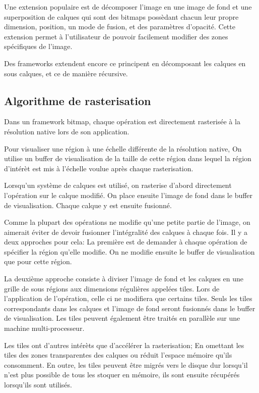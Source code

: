 			Une extension populaire est de décomposer l'image en une image de fond et une superposition de calques qui sont des bitmaps possèdant chacun leur propre
			dimension, position, un mode de fusion, et des paramètres d'opacité. Cette extension permet à l'utilisateur de pouvoir facilement modifier des zones
			spécifiques de l'image.

			Des frameworks extendent encore ce principent en décomposant les calques en sous calques, et ce de manière récursive. 

		\subsection{Algorithme de rasterisation}
			Dans un framework bitmap, chaque opération est directement rasterisée à la résolution native lors de son application. 
			
			Pour visualiser une région à une échelle différente de la résolution native, On utilise un buffer de visualisation de la taille
			de cette région dans lequel la région d'intérèt est mis à l'échelle voulue après chaque rasterisation.
			
			Lorsqu'un système de calques est utilisé, on rasterise d'abord directement l'opération sur le calque modifié. On place ensuite l'image
			de fond dans le buffer de visualisation. Chaque calque y est ensuite fusionné.			
			
			Comme la plupart des opérations ne modifie qu'une petite partie de l'image, on aimerait éviter de devoir fusionner l'intégralité
			des calques à chaque fois. Il y a deux approches pour cela: La première est de demander à chaque opération de spécifier la région
			qu'elle modifie. On ne modifie ensuite le buffer de visualisation que pour cette région. 

			La deuxième approche consiste à diviser l'image de fond et les calques en une grille de sous régions aux dimensions régulières appelées
			tiles. Lors de l'application de l'opération, celle ci ne modifiera que certains tiles. Seuls les tiles correspondants dans les calques
			et l'image de fond seront fusionnés dans le buffer de visualisation. Les tiles peuvent également être traités en parallèle sur une 
			machine multi-processeur.

			Les tiles ont d'autres intérèts que d'accélérer la rasterisation; En omettant les tiles des zones transparentes des calques ou réduit 
			l'espace mémoire qu'ils consomment. En outre, les tiles peuvent être migrés vers le disque dur lorsqu'il n'est plus possible de tous
			les stoquer en mémoire, ils sont ensuite récupérés lorsqu'ils sont utilisés. 
			
